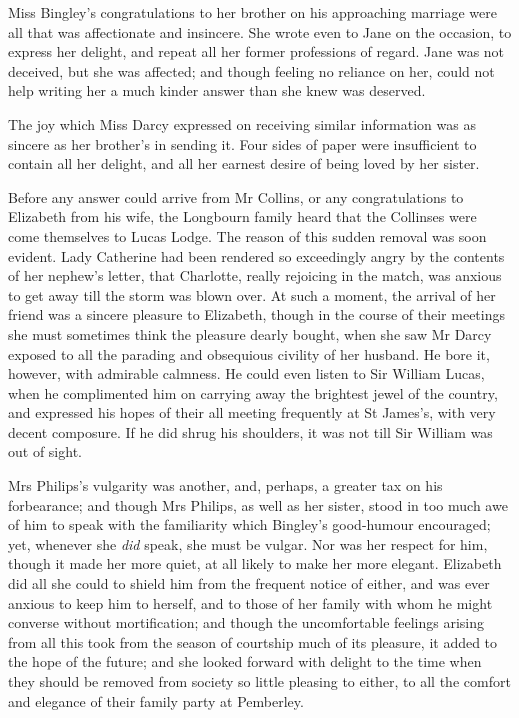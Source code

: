 Miss Bingley's congratulations to her brother on his approaching marriage were all that was affectionate and insincere. She wrote even to Jane on the occasion, to express her delight, and repeat all her former professions of regard. Jane was not deceived, but she was affected; and though feeling no reliance on her, could not help writing her a much kinder answer than she knew was deserved.

The joy which Miss Darcy expressed on receiving similar information was as sincere as her brother's in sending it. Four sides of paper were insufficient to contain all her delight, and all her earnest desire of being loved by her sister.

Before any answer could arrive from Mr Collins, or any congratulations to Elizabeth from his wife, the Longbourn family heard that the Collinses were come themselves to Lucas Lodge. The reason of this sudden removal was soon evident. Lady Catherine had been rendered so exceedingly angry by the contents of her nephew's letter, that Charlotte, really rejoicing in the match, was anxious to get away till the storm was blown over. At such a moment, the arrival of her friend was a sincere pleasure to Elizabeth, though in the course of their meetings she must sometimes think the pleasure dearly bought, when she saw Mr Darcy exposed to all the parading and obsequious civility of her husband. He bore it, however, with admirable calmness. He could even listen to Sir William Lucas, when he complimented him on carrying away the brightest jewel of the country, and expressed his hopes of their all meeting frequently at St James's, with very decent composure. If he did shrug his shoulders, it was not till Sir William was out of sight.

Mrs Philips's vulgarity was another, and, perhaps, a greater tax on his forbearance; and though Mrs Philips, as well as her sister, stood in too much awe of him to speak with the familiarity which Bingley's good-humour encouraged; yet, whenever she \textit{did} speak, she must be vulgar. Nor was her respect for him, though it made her more quiet, at all likely to make her more elegant. Elizabeth did all she could to shield him from the frequent notice of either, and was ever anxious to keep him to herself, and to those of her family with whom he might converse without mortification; and though the uncomfortable feelings arising from all this took from the season of courtship much of its pleasure, it added to the hope of the future; and she looked forward with delight to the time when they should be removed from society so little pleasing to either, to all the comfort and elegance of their family party at Pemberley.
